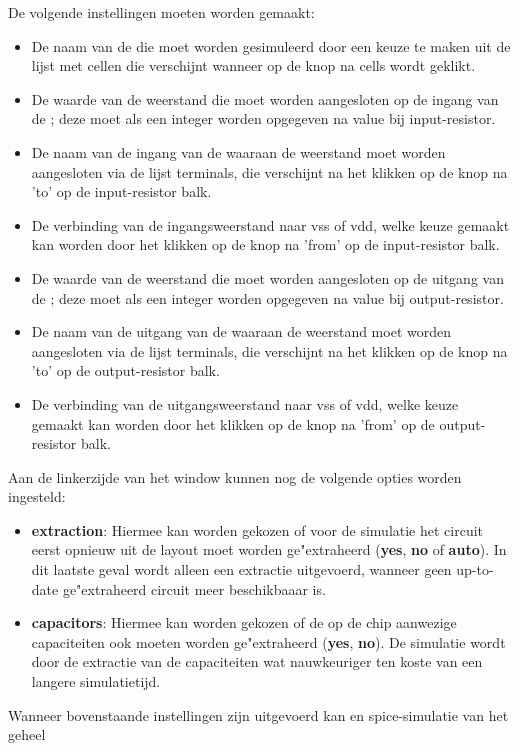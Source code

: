 \begin{itemize}
De volgende instellingen moeten worden gemaakt:
\begin{itemize}
\item De naam van de  die moet worden gesimuleerd door een keuze te maken
     uit de lijst met cellen die verschijnt wanneer op de knop na cells wordt
     geklikt.
\item De waarde van de weerstand die moet worden aangesloten op de ingang van
      de ; deze moet als een integer worden opgegeven na value bij
      input-resistor.
\item De naam van de ingang van de  waaraan de weerstand moet worden
      aangesloten via de lijst terminals, die verschijnt na het klikken op de
      knop na 'to' op de input-resistor balk.
\item De verbinding van de ingangsweerstand naar vss of vdd, welke keuze
      gemaakt kan worden door het klikken op de knop na 'from' op de
      input-resistor balk.
\item De waarde van de weerstand die moet worden aangesloten op de uitgang van
      de ; deze moet als een integer worden opgegeven na value bij
      output-resistor.
\item De naam van de uitgang van de  waaraan de weerstand moet worden
      aangesloten via de lijst terminals, die verschijnt na het klikken op de
      knop na 'to' op de output-resistor balk.
\item De verbinding van de uitgangsweerstand naar vss of vdd, welke keuze
      gemaakt kan worden door het klikken op de knop na 'from' op de
      output-resistor balk.
\end{itemize}
Aan de linkerzijde van het window kunnen nog de volgende opties worden ingesteld:
\begin{itemize}
\item {\bf extraction}: Hiermee kan worden gekozen of voor de simulatie het circuit
      eerst opnieuw uit de layout moet worden ge"extraheerd ({\bf yes}, {\bf no} of {\bf auto}).
      In dit laatste geval wordt alleen een extractie uitgevoerd, wanneer geen
      up-to-date ge"extraheerd circuit meer beschikbaaar is.
\item {\bf capacitors}: Hiermee kan worden gekozen of de op de chip aanwezige
      capaciteiten ook moeten worden ge"extraheerd ({\bf yes}, {\bf no}). De simulatie wordt
      door de extractie van de capaciteiten wat nauwkeuriger ten koste
      van een langere simulatietijd.
\end{itemize}
Wanneer bovenstaande instellingen zijn uitgevoerd kan en spice-simulatie van het geheel

\end{itemize}
